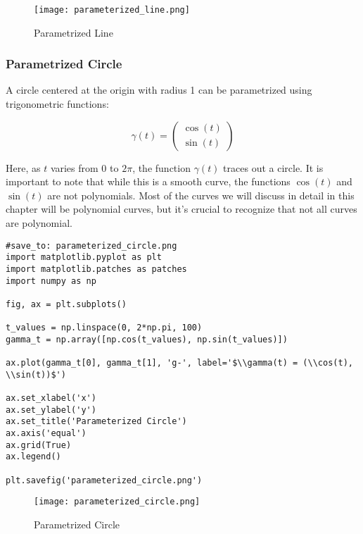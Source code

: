 \documentclass{article}
\begin{document}
\begin{figure}[h]
\centering
\texttt{[image: parameterized\_line.png]}
\caption{Parametrized Line}
\label{fig:parameterized_line}
\end{figure}


\subsubsection{Parametrized Circle}

A circle centered at the origin with radius 1 can be parametrized using trigonometric functions:

\begin{equation}
\gamma(t) = \begin{pmatrix} \cos(t) \\ \sin(t) \end{pmatrix}
\end{equation}

Here, as \(t\) varies from \(0\) to \(2\pi\), the function \(\gamma(t)\) traces out a circle. It is important to note that while this is a smooth curve, the functions \(\cos(t)\) and \(\sin(t)\) are not polynomials. Most of the curves we will discuss in detail in this chapter will be polynomial curves, but it's crucial to recognize that not all curves are polynomial.

\begin{verbatim}
#save_to: parameterized_circle.png
import matplotlib.pyplot as plt
import matplotlib.patches as patches
import numpy as np

fig, ax = plt.subplots()

t_values = np.linspace(0, 2*np.pi, 100)
gamma_t = np.array([np.cos(t_values), np.sin(t_values)])

ax.plot(gamma_t[0], gamma_t[1], 'g-', label='$\\gamma(t) = (\\cos(t), \\sin(t))$')

ax.set_xlabel('x')
ax.set_ylabel('y')
ax.set_title('Parameterized Circle')
ax.axis('equal')
ax.grid(True)
ax.legend()

plt.savefig('parameterized_circle.png')
\end{verbatim}

\begin{figure}[h]
\centering
\texttt{[image: parameterized\_circle.png]}
\caption{Parametrized Circle}
\label{fig:parameterized_circle}
\end{figure}
\end{document}
